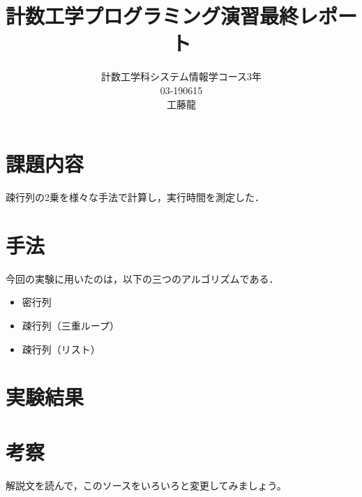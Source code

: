 \documentclass{jsarticle}
\begin{document}
\title{計数工学プログラミング演習最終レポート}
\author{計数工学科システム情報学コース3年\\03-190615\\工藤龍}
\maketitle

\section{課題内容}

疎行列の2乗を様々な手法で計算し，実行時間を測定した．


\section{手法}

今回の実験に用いたのは，以下の三つのアルゴリズムである．
\begin{itemize}
\item 密行列
\item 疎行列（三重ループ）
\item 疎行列（リスト）
\end{itemize}


\section{実験結果}



\section{考察}

解説文を読んで，このソースをいろいろと変更してみましょう。
\end{document}
